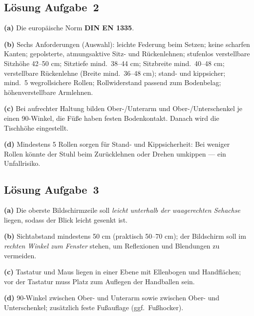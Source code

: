 \documentclass[11pt, a4paper]{article}
\begin{document}
\subsection*{Lösung Aufgabe~2}
\begin{loesung}
\textbf{(a)} Die europäische Norm \textbf{DIN EN 1335}.

\textbf{(b)} Sechs Anforderungen (Auswahl): leichte Federung beim Setzen; keine scharfen
Kanten; gepolsterte, atmungsaktive Sitz- und Rückenlehnen; stufenlos verstellbare Sitzhöhe
42--50 cm; Sitztiefe mind.\ 38--44 cm; Sitzbreite mind.\ 40--48 cm; verstellbare
Rückenlehne (Breite mind.\ 36--48 cm); stand- und kippsicher; mind.\ 5 wegrollsichere Rollen;
Rollwiderstand passend zum Bodenbelag; höhenverstellbare Armlehnen.

\textbf{(c)} Bei aufrechter Haltung bilden Ober-/Unterarm und Ober-/Unterschenkel je einen
90\textdegree-Winkel, die Füße haben festen Bodenkontakt. Danach wird die Tischhöhe eingestellt.

\textbf{(d)} Mindestens 5 Rollen sorgen für Stand- und Kippsicherheit: Bei weniger Rollen
könnte der Stuhl beim Zurücklehnen oder Drehen umkippen --- ein Unfallrisiko.
\end{loesung}

\subsection*{Lösung Aufgabe~3}
\begin{loesung}
\textbf{(a)} Die oberste Bildschirmzeile soll \emph{leicht unterhalb der waagerechten
Sehachse} liegen, sodass der Blick leicht gesenkt ist.

\textbf{(b)} Sichtabstand mindestens 50 cm (praktisch 50--70 cm); der Bildschirm soll im
\emph{rechten Winkel zum Fenster} stehen, um Reflexionen und Blendungen zu vermeiden.

\textbf{(c)} Tastatur und Maus liegen in einer Ebene mit Ellenbogen und Handflächen; vor der
Tastatur muss Platz zum Auflegen der Handballen sein.

\textbf{(d)} 90\textdegree-Winkel zwischen Ober- und Unterarm sowie zwischen Ober- und
Unterschenkel; zusätzlich feste Fußauflage (ggf.\ Fußhocker).
\end{loesung}
\end{document}
